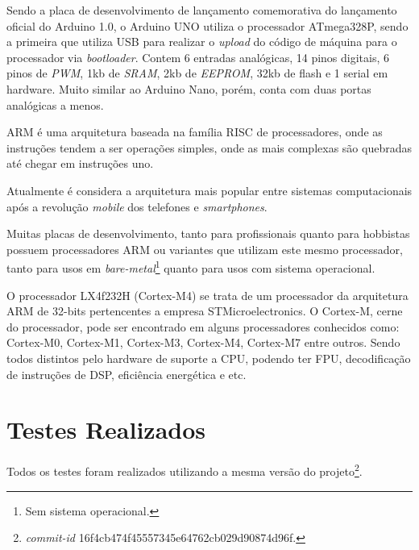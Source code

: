 Sendo a placa de desenvolvimento de lançamento comemorativa do lançamento oficial do Arduino 1.0, o Arduino UNO utiliza o processador ATmega328P, sendo a primeira que utiliza USB para realizar o \textit{upload} do código de máquina para o processador via \textit{bootloader}. Contem 6 entradas analógicas, 14 pinos digitais, 6 pinos de \textit{PWM}, 1kb de \textit{SRAM}, 2kb de \textit{EEPROM}, 32kb de flash e 1 serial em hardware. Muito similar ao Arduino Nano, porém, conta com duas portas analógicas a menos.


ARM é uma arquitetura baseada na família RISC de processadores, onde as instruções tendem a ser operações simples, onde as mais complexas são quebradas até chegar em instruções uno.

Atualmente é considera a arquitetura mais popular entre sistemas computacionais após a revolução \textit{mobile} dos telefones e \textit{smartphones}.

Muitas placas de desenvolvimento, tanto para profissionais quanto para hobbistas possuem processadores ARM ou variantes que utilizam este mesmo processador, tanto para usos em \textit{bare-metal}\footnote{Sem sistema operacional.} quanto para usos com sistema operacional.


O processador LX4f232H (Cortex-M4) se trata de um processador da arquitetura ARM de 32-bits pertencentes a empresa STMicroelectronics. O Cortex-M, cerne do processador, pode ser encontrado em alguns processadores conhecidos como: Cortex-M0, Cortex-M1, Cortex-M3, Cortex-M4, Cortex-M7 entre outros. Sendo todos distintos pelo hardware de suporte a CPU, podendo ter FPU, decodificação de instruções de DSP, eficiência energética e etc.


\section{Testes Realizados}

Todos os testes foram realizados utilizando a mesma versão do projeto\footnote{\textit{commit-id} 16f4cb474f45557345e64762cb029d90874d96f.}.

